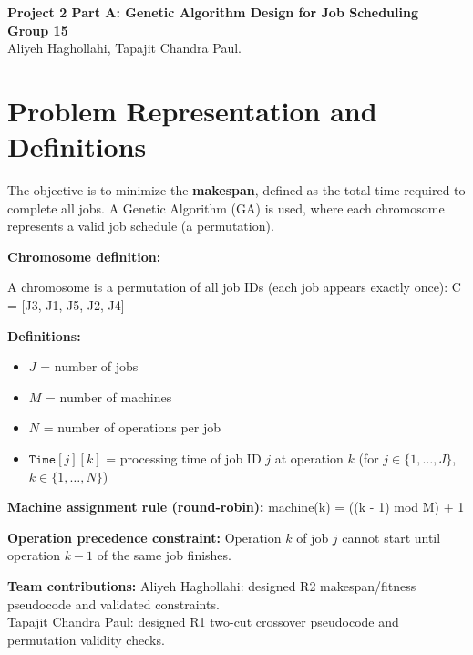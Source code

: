 \documentclass[10pt,twocolumn]{article}
\begin{document}
\begin{center}
{\large \textbf{Project 2 Part A: Genetic Algorithm Design for Job Scheduling}}\\
\vspace{2pt}
\textbf{Group 15}\\
Aliyeh Haghollahi, Tapajit Chandra Paul.
\end{center}

\vspace{-6pt}

\section{Problem Representation and Definitions}

The objective is to minimize the \textbf{makespan}, defined as the total time required to complete all jobs. A Genetic Algorithm (GA) is used, where each chromosome represents a valid job schedule (a permutation).

\textbf{Chromosome definition:}

A chromosome is a permutation of all job IDs (each job appears exactly once):
{\small\ttfamily
C = [J3, J1, J5, J2, J4]
}

\textbf{Definitions:}
\begin{itemize}[leftmargin=10pt]
\item $J$ = number of jobs
\item $M$ = number of machines
\item $N$ = number of operations per job
\item $\texttt{Time}[j][k]$ = processing time of job ID $j$ at operation $k$ (for $j\in\{1,\dots,J\}$, $k\in\{1,\dots,N\}$)
\end{itemize}

\textbf{Machine assignment rule (round-robin):}
{\small\ttfamily
machine(k) = ((k - 1) mod M) + 1
}

\textbf{Operation precedence constraint:}
Operation $k$ of job $j$ cannot start until operation $k-1$ of the same job finishes.

\textbf{Team contributions:}
Aliyeh Haghollahi: designed R2 makespan/fitness pseudocode and validated constraints.\\
Tapajit Chandra Paul: designed R1 two-cut crossover pseudocode and permutation validity checks.

\vspace{-6pt}
\end{document}
